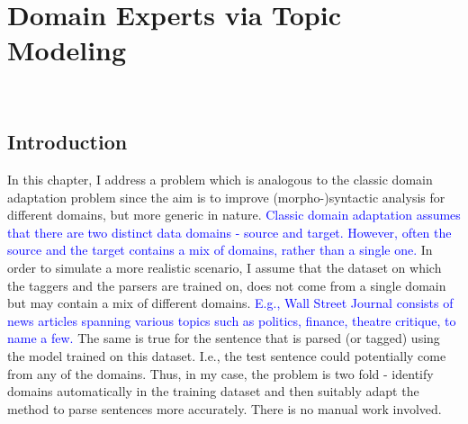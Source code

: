 \chapter{Domain Experts via Topic Modeling}~\label{chap:domainexperts}


\section{Introduction}

In this chapter, I address a problem which is analogous to the classic domain adaptation problem since the aim is to improve (morpho-)syntactic analysis for different domains, but more generic in nature. \textcolor{blue}{Classic domain adaptation assumes that there are two distinct data domains - source and target. However, often the source and the target contains a mix of domains, rather than a single one.} In order to simulate a more realistic scenario, I assume that the  dataset on which the taggers and the parsers are trained on, does not come from a single domain but may contain a mix of different domains. \textcolor{blue}{E.g., Wall Street Journal consists of news articles spanning various topics such as politics, finance, theatre critique, to name a few.} The same is true for the sentence that is parsed (or tagged) using the model trained on this dataset. I.e., the test sentence could potentially come from any of the domains. Thus, in my case, the problem is two fold - identify domains automatically in the training dataset and then suitably adapt the method to parse sentences more accurately. There is no manual work involved. 

